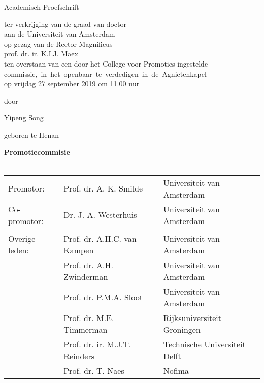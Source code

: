 {%
\clearpage
\par\vskip 2cm
\begin{center}
\printtitle
\par\vspace {6cm}
{\large \sc Academisch Proefschrift}
\par\vspace {1cm}
{\large ter verkrijging van de graad van doctor\\
aan de Universiteit van Amsterdam\\
op gezag van de Rector Magnificus\\
prof. dr. ir. K.I.J. Maex \\                                 %
ten overstaan van een door het College voor Promoties ingestelde\\
\mbox{commissie, in het openbaar te verdedigen in de Agnietenkapel}\\        %
op vrijdag 27 september 2019 om 11.00 uur \\ }        %
\par\vspace {1cm} {\large door}
\par \vspace {1cm} %
{\Large Yipeng Song \\}                        %
\par\vspace {1cm} %
{\large geboren te Henan} %
\end{center}

\clearpage
\par\vskip 2cm

\noindent%
{\bf Promotiecommisie}\\
\\
\begin{tabular}[t]{@{}lll}
Promotor:      & Prof. dr. A. K. Smilde & Universiteit van Amsterdam \\  %
Co-promotor:   & Dr. J. A. Westerhuis   & Universiteit van Amsterdam \\  %
\\
Overige leden: & Prof. dr. A.H.C. van Kampen  & Universiteit van Amsterdam \\  %
               & Prof. dr. A.H. Zwinderman  & Universiteit van Amsterdam \\  %
               & Prof. dr. P.M.A. Sloot  & Universiteit van Amsterdam \\  %
               & Prof. dr. M.E. Timmerman & Rijksuniversiteit Groningen \\
               & Prof. dr. ir. M.J.T. Reinders & Technische Universiteit Delft \\
               & Prof. dr. T. Naes  & Nofima
\end{tabular}\\
\\

}
